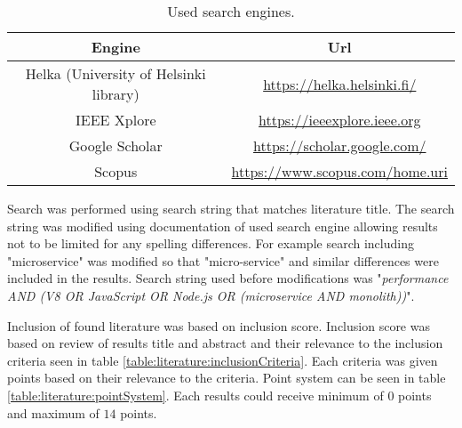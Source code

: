 \begin{table}[h!]
    \begin{tabular}{| c | c |} 
        \hline
        Engine
        & Url
        \\ [0.5ex] \hline
        
        Helka (University of Helsinki library)
        & \url{https://helka.helsinki.fi/}
        \\ \hline
        
        IEEE Xplore
        & \url{https://ieeexplore.ieee.org}
        \\ \hline
        
        Google Scholar
        & \url{https://scholar.google.com/}
        \\ \hline

        Scopus
        & \url{https://www.scopus.com/home.uri}
        \\ \hline
    \end{tabular}    
    \caption{Used search engines.}
    \label{table:literature:searchEngines}
\end{table}

Search was performed using search string that matches literature title.
The search string was modified using documentation of used search engine allowing results not to be limited for any spelling differences.
For example search including "microservice" was modified so that "micro-service" and similar differences were included in the results.
Search string used before modifications was "\textit{performance AND (V8 OR JavaScript OR Node.js OR (microservice AND monolith))}".

Inclusion of found literature was based on inclusion score.
Inclusion score was based on review of results title and abstract and their relevance to the inclusion criteria seen in table \ref{table:literature:inclusionCriteria}.
Each criteria was given points based on their relevance to the criteria.
Point system can be seen in table \ref{table:literature:pointSystem}.
Each results could receive minimum of $0$ points and maximum of $14$ points.

